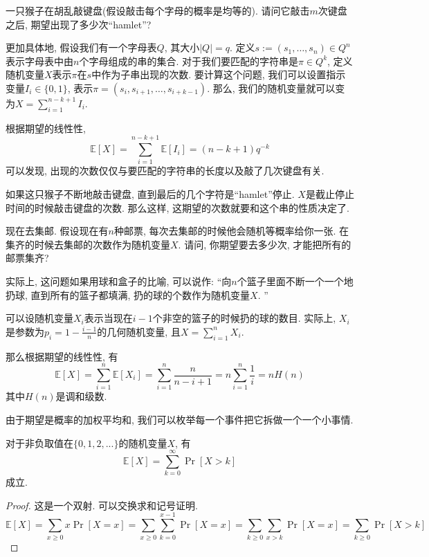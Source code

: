 \documentclass{ctexart}
\begin{document}
\begin{example}
    一只猴子在胡乱敲键盘(假设敲击每个字母的概率是均等的). 请问它敲击$m$次键盘之后, 期望出现了多少次``hamlet''?

    更加具体地, 假设我们有一个字母表$Q$, 其大小$|Q|=q$. 定义$s:=\left(s_1, \ldots, s_n\right) \in Q^n$表示字母表中由$n$个字母组成的串的集合. 对于我们要匹配的字符串是$\pi \in Q^k$, 定义随机变量$X$表示$\pi$在$s$中作为子串出现的次数. 
    要计算这个问题, 我们可以设置指示变量$I_i \in \{ 0, 1 \}$, 表示$\pi=\left(s_i, s_{i+1}, \ldots, s_{i+k-1}\right)$. 那么, 我们的随机变量就可以变为$X=\sum_{i=1}^{n-k+1} I_i$. 

    根据期望的线性性, 
    $$
\mathbb{E}[X]=\sum_{i=1}^{n-k+1} \mathbb{E}\left[I_i\right]=(n-k+1) q^{-k}
$$
可以发现, 出现的次数仅仅与要匹配的字符串的长度以及敲了几次键盘有关. 

如果这只猴子不断地敲击键盘, 直到最后的几个字符是``hamlet''停止. $X$是截止停止时间的时候敲击键盘的次数. 那么这样, 这期望的次数就要和这个串的性质决定了. 

\end{example}

\begin{example}[邮票收集者]
    现在去集邮. 假设现在有$n$种邮票, 每次去集邮的时候他会随机等概率给你一张. 在集齐的时候去集邮的次数作为随机变量$X$. 请问, 你期望要去多少次, 才能把所有的邮票集齐? 

    实际上, 这问题如果用球和盒子的比喻, 可以说作: ``向$n$个篮子里面不断一个一个地扔球, 直到所有的篮子都填满, 扔的球的个数作为随机变量$X$. ''

    可以设随机变量$X_i$表示当现在$i-1$个非空的篮子的时候扔的球的数目. 实际上, $X_i$是参数为$p_i=1-\frac{i-1}{n}$的几何随机变量, 且$X=\sum_{i=1}^n X_i$. 

    那么根据期望的线性性, 有
    $$
\mathbb{E}[X]=\sum_{i=1}^n \mathbb{E}\left[X_i\right]=\sum_{i=1}^n \frac{n}{n-i+1}=n \sum_{i=1}^n \frac{1}{i}=n H(n)
$$
其中$H(n)$是调和级数. 
    
\end{example}

由于期望是概率的加权平均和, 我们可以枚举每一个事件把它拆做一个一个小事情. 

\begin{theorem}
    对于非负取值在$\{ 0,1,2, ... \}$的随机变量$X$, 有
    $$
\mathbb{E}[X]=\sum_{k=0}^{\infty} \operatorname{Pr}[X>k]
$$
成立. 
\end{theorem}

\begin{proof}
    这是一个双射. 可以交换求和记号证明. 
    $$
\mathbb{E}[X]=\sum_{x \geq 0} x \operatorname{Pr}[X=x]=\sum_{x \geq 0} \sum_{k=0}^{x-1} \operatorname{Pr}[X=x]=\sum_{k \geq 0} \sum_{x>k} \operatorname{Pr}[X=x]=\sum_{k \geq 0} \operatorname{Pr}[X>k]
$$
\end{proof}
\end{document}
